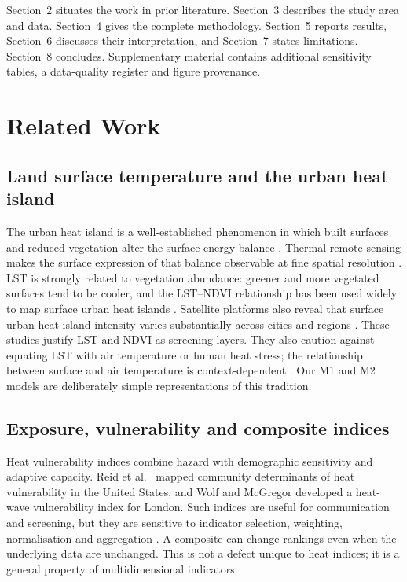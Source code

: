 \documentclass[times,twoside]{_Templates/MultiTargetManuscript}
\begin{document}
Section~2 situates the work in prior literature. Section~3 describes the study
area and data. Section~4 gives the complete methodology. Section~5 reports
results, Section~6 discusses their interpretation, and Section~7 states
limitations. Section~8 concludes. Supplementary material contains additional
sensitivity tables, a data-quality register and figure provenance.

\section{Related Work}

\subsection{Land surface temperature and the urban heat island}

The urban heat island is a well-established phenomenon in which built surfaces
and reduced vegetation alter the surface energy balance \citep{oke1982}. Thermal
remote sensing makes the surface expression of that balance observable at fine
spatial resolution \citep{voogt2003}. LST is strongly related to vegetation
abundance: greener and more vegetated surfaces tend to be cooler, and the
LST--NDVI relationship has been used widely to map surface urban heat islands
\citep{weng2004,peng2012,estoque2017}. Satellite platforms also reveal that
surface urban heat island intensity varies substantially across cities and
regions \citep{peng2012,zhou2019}. These studies justify LST and NDVI as
screening layers. They also caution against equating LST with air temperature or
human heat stress; the relationship between surface and air temperature is
context-dependent \citep{schwarz2012}. Our M1 and M2 models are deliberately
simple representations of this tradition.

\subsection{Exposure, vulnerability and composite indices}

Heat vulnerability indices combine hazard with demographic sensitivity and
adaptive capacity. Reid et al.\ \citep{reid2009} mapped community determinants of
heat vulnerability in the United States, and Wolf and McGregor
\citep{wolf2013} developed a heat-wave vulnerability index for London. Such
indices are useful for communication and screening, but they are sensitive to
indicator selection, weighting, normalisation and aggregation
\citep{saisana2005,paruolo2013,greco2019}. A composite can change rankings even
when the underlying data are unchanged. This is not a defect unique to heat
indices; it is a general property of multidimensional indicators.
\end{document}
